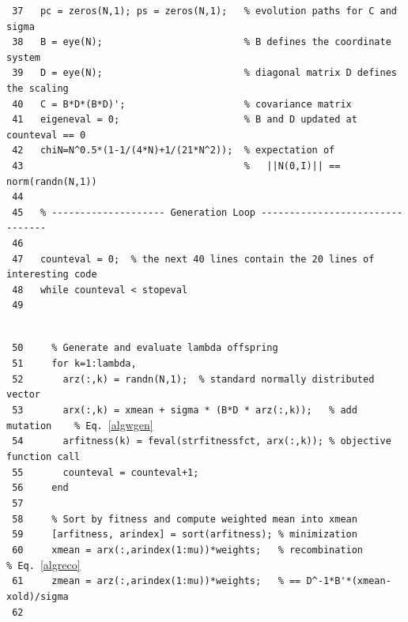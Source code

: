\documentclass{article} %
\newcommand{\tabverb}{\hspace*{0.0ex}\verb}
\begin{document}
\begin{appendix}
\begin{scriptsize}
\begin{verbatim}
 37   pc = zeros(N,1); ps = zeros(N,1);   % evolution paths for C and sigma
 38   B = eye(N);                         % B defines the coordinate system
 39   D = eye(N);                         % diagonal matrix D defines the scaling
 40   C = B*D*(B*D)';                     % covariance matrix
 41   eigeneval = 0;                      % B and D updated at counteval == 0
 42   chiN=N^0.5*(1-1/(4*N)+1/(21*N^2));  % expectation of 
 43                                       %   ||N(0,I)|| == norm(randn(N,1))
 44   
 45   % -------------------- Generation Loop --------------------------------
 46 
 47   counteval = 0;  % the next 40 lines contain the 20 lines of interesting code 
 48   while counteval < stopeval
 49
\end{verbatim}~\\[-5.33ex]
\tabverb| 50     %
\tabverb| 51     for k=1:lambda,                                                      |\\
\tabverb| 52       arz(:,k) = randn(N,1);  %
\tabverb| 53       arx(:,k) = xmean + sigma * (B*D * arz(:,k));   %
\tabverb| 54       arfitness(k) = feval(strfitnessfct, arx(:,k)); %
\tabverb| 55       counteval = counteval+1;                                           |\\
\tabverb| 56     end                                                                  |\\
\tabverb| 57                                                                          |\\
\tabverb| 58     %
\tabverb| 59     [arfitness, arindex] = sort(arfitness); %
\tabverb| 60     xmean = arx(:,arindex(1:mu))*weights;   %
\tabverb| 61     zmean = arz(:,arindex(1:mu))*weights;   %
\tabverb| 62                                                                          |\\

\end{scriptsize}
\end{appendix}
\end{document}
